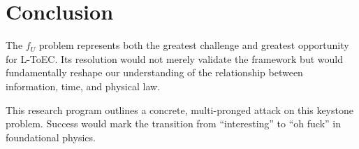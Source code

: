 \documentclass[11pt]{article}
\begin{document}
\section{Conclusion}

The $f_U$ problem represents both the greatest challenge and greatest opportunity for L-ToEC.
Its resolution would not merely validate the framework but would fundamentally reshape our
understanding of the relationship between information, time, and physical law.

This research program outlines a concrete, multi-pronged attack on this keystone problem.
Success would mark the transition from ``interesting'' to ``oh fuck'' in foundational physics.
\end{document}
